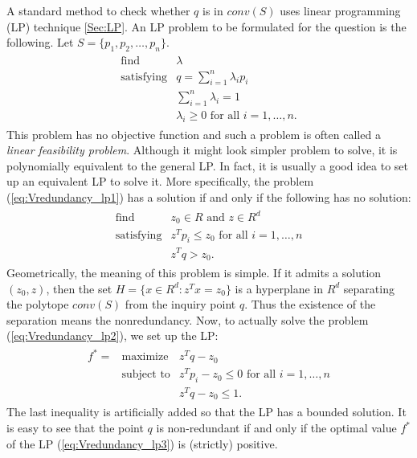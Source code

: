 \documentclass[[a4paper,12pt]{article}
\begin{document}
A standard method to check
whether $q$ is in $conv(S)$ uses 
linear programming (LP) technique \ref{Sec:LP}.   
An LP problem to be formulated for
the question is the following.  Let $S=\{p_1, p_2, \ldots, p_n \}$.
\begin{align} \label{eq:Vredundancy_lp1}
\begin{array}{lll}
\text{find}        & \lambda\\
\text{satisfying}  & q = \sum_{i=1}^n \lambda_i p_i \\  
                   & \sum_{i=1}^n \lambda_i = 1\\
                   & \lambda_i \ge 0 \text{ for all } i=1, \ldots, n.
\end{array}
\end{align}
This problem has no objective function and such a problem is
often called a {\em linear feasibility problem}.  Although it
might look simpler problem to solve, it is polynomially equivalent
to the general LP.  In fact, it is usually a good idea to set up
an equivalent LP to solve it.  More specifically, the problem
(\ref{eq:Vredundancy_lp1}) has a solution if and only if the following
has no solution:
\begin{align} \label{eq:Vredundancy_lp2}
\begin{array}{lll}
\text{find}        & z_0\in R \text{ and } z \in R^d\\
\text{satisfying}  & z^T p_i \le z_0 \text{ for all } i=1, \ldots, n\\  
                   & z^T q > z_0.
\end{array}
\end{align}
Geometrically, the meaning of this problem is simple.  If it admits
a solution $(z_0, z)$, then the set $H=\{x \in R^d: z^T x = z_0 \}$
is a hyperplane in $R^d$ separating the polytope $conv(S)$ from the 
inquiry point $q$.  Thus the existence of the separation means
the nonredundancy.   Now, to actually solve the problem
(\ref{eq:Vredundancy_lp2}), we set up the LP:
\begin{align} \label{eq:Vredundancy_lp3}
\begin{array}{lll}
f^* = &\text{maximize}    & z^T q - z_0\\
&\text{subject to}  & z^T p_i - z_0  \le 0\text{ for all } i=1, \ldots, n\\  
&                   & z^T q - z_0  \le  1.
\end{array}
\end{align}
The last inequality is artificially added so that the LP has
a bounded solution.  It is easy to see that the point $q$ is 
non-redundant if and only if the optimal value $f^*$ of 
the LP (\ref{eq:Vredundancy_lp3}) is (strictly) positive.
\end{document}
